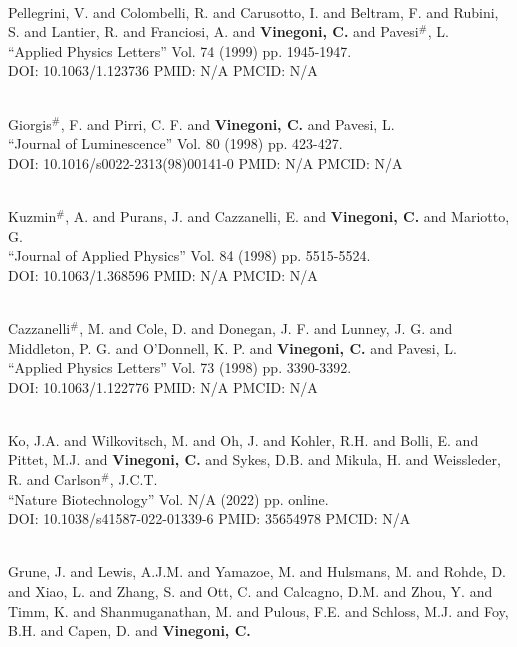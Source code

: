  \\ Pellegrini, V. and Colombelli, R. and Carusotto, I. and Beltram, F. and Rubini, S. and Lantier, R. and Franciosi, A. and {\bf Vinegoni, C.} and Pavesi$^\#$, L. \\ ``Applied Physics Letters'' Vol. 74 (1999) pp. 1945-1947. \\ DOI: 10.1063/1.123736 PMID: N/A PMCID: N/A\item {} \\ Giorgis$^\#$, F. and Pirri, C. F. and {\bf Vinegoni, C.} and Pavesi, L. \\ ``Journal of Luminescence'' Vol. 80 (1998) pp. 423-427. \\ DOI: 10.1016/s0022-2313(98)00141-0 PMID: N/A PMCID: N/A\item {} \\ Kuzmin$^\#$, A. and Purans, J. and Cazzanelli, E. and {\bf Vinegoni, C.} and Mariotto, G. \\ ``Journal of Applied Physics'' Vol. 84 (1998) pp. 5515-5524. \\ DOI: 10.1063/1.368596 PMID: N/A PMCID: N/A\item {} \\ Cazzanelli$^\#$, M. and Cole, D. and Donegan, J. F. and Lunney, J. G. and Middleton, P. G. and O'Donnell, K. P. and {\bf Vinegoni, C.} and Pavesi, L. \\ ``Applied Physics Letters'' Vol. 73 (1998) pp. 3390-3392. \\ DOI: 10.1063/1.122776 PMID: N/A PMCID: N/A\item {} \\ Ko, J.A. and Wilkovitsch, M. and Oh, J. and Kohler, R.H. and Bolli, E. and Pittet, M.J. and {\bf Vinegoni, C.} and Sykes, D.B. and Mikula, H. and Weissleder, R. and Carlson$^\#$, J.C.T. \\ ``Nature Biotechnology'' Vol. N/A (2022) pp. online. \\ DOI: 10.1038/s41587-022-01339-6 PMID: 35654978 PMCID: N/A\item {} \\ Grune, J. and Lewis, A.J.M. and Yamazoe, M. and Hulsmans, M. and Rohde, D. and Xiao, L. and Zhang, S. and Ott, C. and Calcagno, D.M. and Zhou, Y. and Timm, K. and Shanmuganathan, M. and Pulous, F.E. and Schloss, M.J. and Foy, B.H. and Capen, D. and {\bf Vinegoni, C.} 